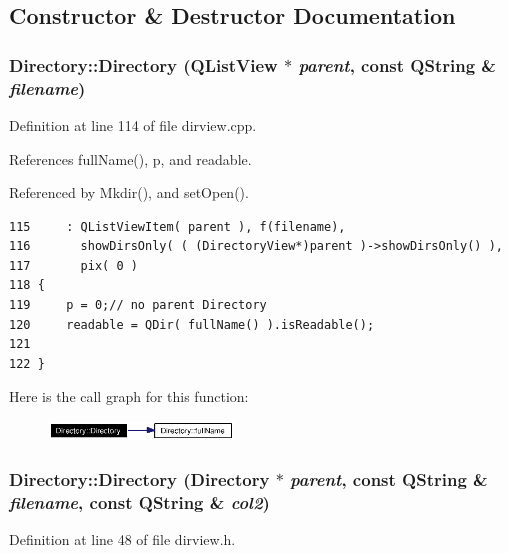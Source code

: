 \subsection{Constructor \& Destructor Documentation}
\subsubsection{\setlength{\rightskip}{0pt plus 5cm}Directory::Directory (QList\-View $\ast$ {\em parent}, const QString \& {\em filename})}\label{classDirectory_Directorya0}




Definition at line 114 of file dirview.cpp.

References full\-Name(), p, and readable.

Referenced by Mkdir(), and set\-Open().



\footnotesize\begin{verbatim}115     : QListViewItem( parent ), f(filename),
116       showDirsOnly( ( (DirectoryView*)parent )->showDirsOnly() ),
117       pix( 0 )
118 {
119     p = 0;// no parent Directory 
120     readable = QDir( fullName() ).isReadable();
121 
122 }
\end{verbatim}\normalsize 


Here is the call graph for this function:\begin{figure}[H]
\begin{center}
\leavevmode
\includegraphics[width=139pt]{classDirectory_Directorya0_cgraph}
\end{center}
\end{figure}
\subsubsection{\setlength{\rightskip}{0pt plus 5cm}Directory::Directory ({\bf Directory} $\ast$ {\em parent}, const QString \& {\em filename}, const QString \& {\em col2})\hspace{0.3cm}{\tt  [inline]}}\label{classDirectory_Directorya1}




Definition at line 48 of file dirview.h.



